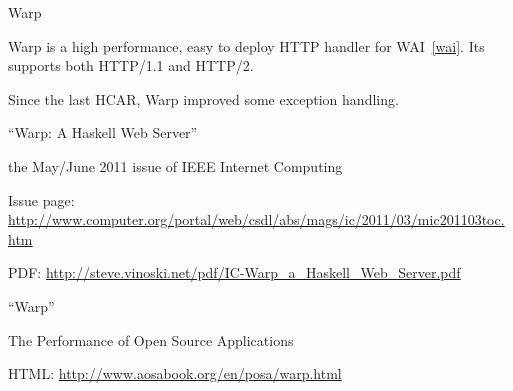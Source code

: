 \begin{hcarentry}[updated]{Warp}
\label{warp}
\makeheader

Warp is a high performance, easy to deploy HTTP handler for WAI~\cref{wai}.
Its supports both HTTP/1.1 and HTTP/2.

Since the last HCAR, Warp improved some exception handling.

\FurtherReading
\begin{compactitem}
\item``Warp: A Haskell Web Server''
  \begin{compactitem}
  \item the May/June 2011 issue of IEEE Internet Computing
  \item Issue page: \url{http://www.computer.org/portal/web/csdl/abs/mags/ic/2011/03/mic201103toc.htm}
  \item  PDF: \url{http://steve.vinoski.net/pdf/IC-Warp\_a\_Haskell\_Web\_Server.pdf}
  \end{compactitem}
\item ``Warp''
  \begin{compactitem}
  \item The Performance of Open Source Applications
  \item HTML: \url{http://www.aosabook.org/en/posa/warp.html}
  \end{compactitem}
\end{compactitem}
\end{hcarentry}
